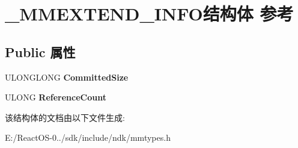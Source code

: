 \hypertarget{struct___m_m_e_x_t_e_n_d___i_n_f_o}{}\section{\+\_\+\+M\+M\+E\+X\+T\+E\+N\+D\+\_\+\+I\+N\+F\+O结构体 参考}
\label{struct___m_m_e_x_t_e_n_d___i_n_f_o}
\subsection*{Public 属性}
\begin{DoxyCompactItemize}
\item 
\mbox{\label{struct___m_m_e_x_t_e_n_d___i_n_f_o_a112b37ccf88786bc5abd61e12ddb9302}} 
U\+L\+O\+N\+G\+L\+O\+NG {\bfseries Committed\+Size}
\item 
\mbox{\label{struct___m_m_e_x_t_e_n_d___i_n_f_o_a150a067a25e1393e8c6997346d6818ab}} 
U\+L\+O\+NG {\bfseries Reference\+Count}
\end{DoxyCompactItemize}


该结构体的文档由以下文件生成\+:\begin{DoxyCompactItemize}
\item 
E\+:/\+React\+O\+S-\/0../sdk/include/ndk/mmtypes.\+h\end{DoxyCompactItemize}
